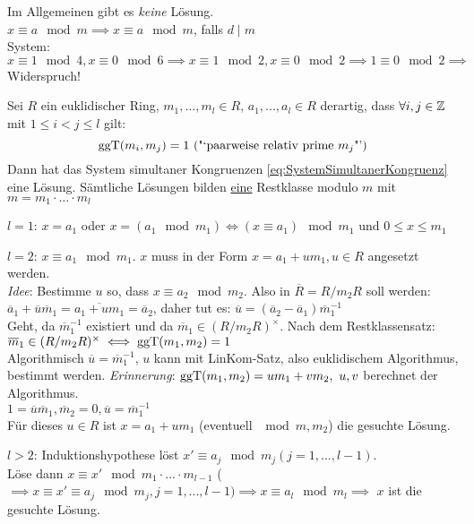 \documentclass[a4paper,twoside,DIV15,BCOR12mm]{scrbook}
\begin{document}
\begin{bemerkung}
    Im Allgemeinen gibt es \emph{keine} Lösung.\\
    $x \equiv a \mod m \implies x \equiv a \mod m$, falls $d \mid m$\\
    System: $x \equiv 1 \mod 4, x \equiv 0 \mod 6 \implies x \equiv 1 \mod 2, x \equiv 0 \mod 2 \implies 1 \equiv 0 \mod 2 \implies$ Widerspruch!
\end{bemerkung}

\begin{satz}
    Sei $R$ ein euklidischer Ring, $m_1, ..., m_l \in R$, $a_1,...,a_l \in R$ derartig, dass $\forall i,j \in \mathbb{Z}$ mit $1 \le i < j \le l$ gilt:\\
    \[ \mathop{\rm ggT}\nolimits(m_i, m_j) = 1\text{ ("`paarweise relativ prime $m_j$"')}\]
    Dann hat das System simultaner Kongruenzen \eqref{eq:SystemSimultanerKongruenz} eine Lösung. Sämtliche Lösungen bilden \underline{eine} Restklasse modulo $m$ mit $m = m_1 \cdot \ldots \cdot m_l$
\end{satz}

\begin{beweis}
\begin{description}
    \item{$l=1$:} $x = a_1$ oder $x = (a_1 \mod m_1) \iff (x \equiv a_1) \mod m_1$ und $0 \le x \le m_1$
    \item{$l=2$:} $x \equiv a_1 \mod m_1$. $x$ muss in der Form $x = a_1 + um_1, u \in R$ angesetzt
        werden.\\
        \emph{Idee}: Bestimme $u$ so, dass $x \equiv a_2 \mod m_2$. Also in $\overline R = R / m_2R$
        soll werden:\\
        $\overline a_1 + \overline u \overline m_1 = \overline{a_1 + um_1} = \overline a_2$, daher tut
         es: $\overline u = (\overline a_2 - \overline a_1)\overline m_1^{-1}$\\
    Geht, da $\overline m_1^{-1}$ existiert und da $\overline m_1 \in (R/m_2R)^\times$. Nach
    dem Restklassensatz: $\overline m_1 \in (R/m_2R)^\times \iff \mathop{\rm ggT}\nolimits(m_1,m_2) = 1$\\
    Algorithmisch $\overline u = \overline m_1^{-1}$, $u$ kann mit LinKom-Satz, also
    euklidischem Algorithmus, bestimmt werden. \emph{Erinnerung}: $\mathop{\rm ggT}\nolimits(m_1,m_2) = um_1 + vm_2,\ u,v$
    berechnet der Algorithmus.\\
    $1 = \overline u \overline m_1, \overline m_2 = 0, \overline u = \overline m_1^{-1}$\\
    Für dieses $u \in R$ ist $x = a_1 + um_1$ (eventuell $\mod m, m_2$) die gesuchte
    Lösung.
    \item{$l>2$:} Induktionshypothese löst $x' \equiv a_j \mod m_j (j = 1,..., l-1)$.\\
     Löse dann $x \equiv x' \mod m_1 \cdot ... \cdot m_{l-1}$ ($\implies x \equiv x' \equiv a_j \mod m_j, j=1,...,l-1) \implies x \equiv a_l \mod m_l \implies$ $x$ ist die gesuchte Lösung.
\end{description}
\end{beweis}
\end{document}
